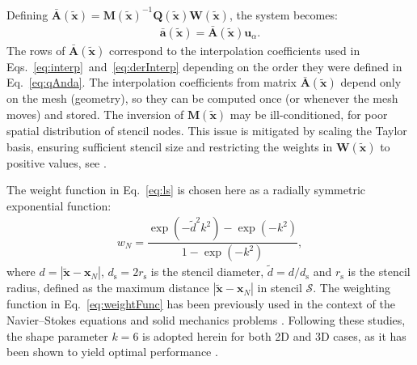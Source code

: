 \documentclass[review,3p]{elsarticle}
\newcommand{\bb}{\boldsymbol}
\begin{document}
Defining $\bar{\mathbf{A}}(\tilde{\bb{x}})=\mathbf{M}(\tilde{\bb{x}})^{-1}\mathbf{Q}(\tilde{\bb{x}})\mathbf{W}(\tilde{\bb{x}})$, the system becomes:
%
\begin{eqnarray}\label{eq:lsA}
	\mathbf{\bar{a}}(\tilde{\bb{x}}) = \mathbf{\bar{A}}(\tilde{\bb{x}})\mathbf{u}_\alpha.
\end{eqnarray}
%
The rows of $\bar{\mathbf{A}}(\tilde{\boldsymbol{x}})$ correspond to the interpolation coefficients used in
Eqs.~\eqref{eq:interp}~and~\eqref{eq:derInterp} depending on the order they were defined in Eq.~\eqref{eq:qAnda}.
The interpolation coefficients from matrix $\bar{\mathbf{A}}(\tilde{\boldsymbol{x}})$ depend only on the mesh (geometry), so they can be computed once (or whenever the mesh moves) and stored.
The inversion of ${\mathbf{M}}(\tilde{\boldsymbol{x}})$ may be ill-conditioned, for poor spatial distribution of stencil nodes.
This issue is mitigated by scaling the Taylor basis, ensuring sufficient stencil size and restricting the weights in $\mathbf{W}(\tilde{\boldsymbol{x}})$ to positive values, see \cite{Castrillo2022, Castrillo2023}.
%

%
The weight function in Eq.~\eqref{eq:ls} is chosen here as a radially symmetric exponential function:
\begin{eqnarray}\label{eq:weightFunc}
	w_N = \dfrac{\exp\left( -\tilde{d}^2k^2\right) -\exp\left(-k^2\right)}{1-\exp\left(-k^2\right)},
\end{eqnarray}
where $d=|\bb{\tilde{x}}-\bb{x}_N|$, $d_{\mathrm{s}}=2r_{\mathrm{s}}$ is the stencil diameter, $\tilde{d}=d/d_{\mathrm{s}}$ and $r_{\mathrm{s}}$ is the stencil radius, defined as the maximum distance $|\bb{\tilde{x}}-\bb{x}_N|$ in stencil $\mathcal{S}$. The weighting function in Eq.~\eqref{eq:weightFunc} has been previously used in the context of the Navier–Stokes equations
\cite{Ramirez2014, Khelladi2011} and solid mechanics problems \cite{Castrillo2022, Castrillo2024, Castrillo2023}.
Following these studies, the shape parameter $k = 6$ is adopted herein for both 2D and 3D cases, as it has been shown to yield optimal performance \cite{Castrillo2022, Castrillo2024, Castrillo2023}.
%
\end{document}
